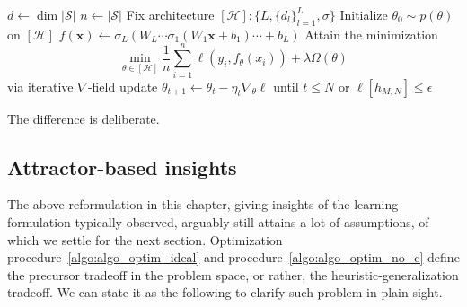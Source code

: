 \begin{algorithm}[htb]
    \renewcommand{\algorithmcfname}{Factory}
    \caption{Neural Network - forward construction class}
    \Begin
    {
        $d \gets \dim|\mathcal{S}|$\;
        $n \gets |\mathcal{S}|$\;
        Fix architecture $[\mathcal{H}]: \{L, \{d_l\}_{l=1}^L, \sigma\}$\;
        Initialize $\theta_0 \sim p(\theta)$ on $[\mathcal{H}]$\;
        $f(\mathbf{x}) \gets \sigma_L(W_L \cdots \sigma_1(W_1 \mathbf{x} + b_1) \cdots + b_L)$\;
        \Objective
        {
            Attain the minimization
            \begin{equation}
                \min_{\theta \in [\mathcal{H}]} 
                \frac{1}{n}\sum_{i=1}^{n} 
                \ell(y_i, f_\theta(x_i)) + 
                \lambda \Omega(\theta)
            \end{equation}
            via iterative $\nabla$-field update
            $\theta_{t+1} \gets \theta_t - \eta_t \nabla_\theta \ell$\;
            until $t \leq N$ or 
            $\ell[h_{M,N}] \leq \epsilon$\;
        }
    }
\end{algorithm}

The difference is deliberate. 

\subsection{Attractor-based insights}

The above reformulation in this chapter, giving insights of the learning formulation typically observed, arguably still attains a lot of assumptions, of which we settle for the next section. Optimization procedure~\ref{algo:algo_optim_ideal} and procedure~\ref{algo:algo_optim_no_c} define the precursor tradeoff in the problem space, or rather, the heuristic-generalization tradeoff. We can state it as the following to clarify such problem in plain sight. 

